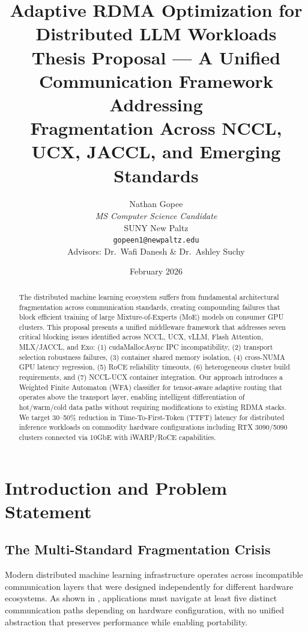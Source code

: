 \documentclass[11pt,letterpaper]{article}
\title{
    \vspace{-1cm}
    \textbf{Adaptive RDMA Optimization for Distributed LLM Workloads} \\[0.5em]
    \large Thesis Proposal --- A Unified Communication Framework Addressing\\Fragmentation Across NCCL, UCX, JACCL, and Emerging Standards
}
\author{
    Nathan Gopee \\
    \textit{MS Computer Science Candidate} \\
    SUNY New Paltz \\
    \texttt{gopeen1@newpaltz.edu} \\[1em]
    \small Advisors: Dr.\ Wafi Danesh \& Dr.\ Ashley Suchy
}
\date{February 2026}
\theoremstyle{definition}
\begin{document}
\maketitle

\begin{abstract}
\noindent
The distributed machine learning ecosystem suffers from fundamental architectural fragmentation across communication standards, creating compounding failures that block efficient training of large Mixture-of-Experts (MoE) models on consumer GPU clusters. This proposal presents a unified middleware framework that addresses seven critical blocking issues identified across NCCL, UCX, vLLM, Flash Attention, MLX/JACCL, and Exo: (1) cudaMallocAsync IPC incompatibility, (2) transport selection robustness failures, (3) container shared memory isolation, (4) cross-NUMA GPU latency regression, (5) RoCE reliability timeouts, (6) heterogeneous cluster build requirements, and (7) NCCL-UCX container integration. Our approach introduces a Weighted Finite Automaton (WFA) classifier for tensor-aware adaptive routing that operates above the transport layer, enabling intelligent differentiation of hot/warm/cold data paths without requiring modifications to existing RDMA stacks. We target 30--50\% reduction in Time-To-First-Token (TTFT) latency for distributed inference workloads on commodity hardware configurations including RTX 3090/5090 clusters connected via 10GbE with iWARP/RoCE capabilities.
\end{abstract}

\tableofcontents
\newpage

\section{Introduction and Problem Statement}

\subsection{The Multi-Standard Fragmentation Crisis}

Modern distributed machine learning infrastructure operates across incompatible communication layers that were designed independently for different hardware ecosystems. As shown in , applications must navigate at least five distinct communication paths depending on hardware configuration, with no unified abstraction that preserves performance while enabling portability.
\end{document}
